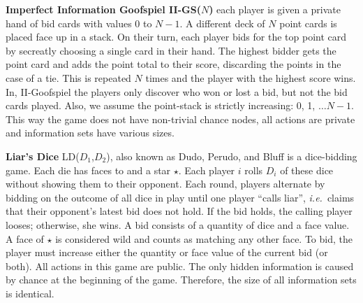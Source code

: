 \documentclass{aamas2015}
\newcommand{\ie}{{\it i.e.}~}
\begin{document}
\textbf{Imperfect Information Goofspiel II-GS($N$)} each player is
given a private hand of bid cards with values $0$ to $N-1$. A different
deck of $N$ point cards is placed face up in a stack.
On their turn, each player bids for the top point card by secreatly choosing a single card in their hand. 
The highest bidder gets the point card and adds the point total to their score, discarding
the points in the case of a tie. 
This is repeated $N$ times and the player with the highest score wins.
In, II-Goofspiel the players only discover who won or lost a bid, but not the bid cards played.
Also, we assume the point-stack is strictly increasing: 0, 1, $\ldots N-1$.
This way the game does not have non-trivial chance nodes, all actions are private and information sets have various sizes.

\textbf{Liar's Dice} LD($D_1$,$D_2$), also known as Dudo, Perudo, and Bluff is a dice-bidding game. 
Each die has faces  to  and a star $\star$. 
Each player $i$ rolls $D_i$ of these dice without showing them to their opponent.
Each round, players alternate by bidding on the outcome of all dice in play until one player ``calls liar'', 
\ie claims that their opponent's latest bid does not hold.
If the bid holds, the calling player looses; otherwise, she wins.
A bid consists of a quantity of dice and a face value.  
A face of $\star$ is considered wild and counts as matching any other face.
To bid, the player must increase either the quantity or face value of the current 
bid (or both).
All actions in this game are public. The only hidden information is caused by chance at the beginning of the game. Therefore, the size of all information sets is identical. 
\end{document}
